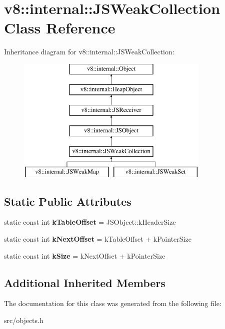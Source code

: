 \hypertarget{classv8_1_1internal_1_1_j_s_weak_collection}{}\section{v8\+:\+:internal\+:\+:J\+S\+Weak\+Collection Class Reference}
\label{classv8_1_1internal_1_1_j_s_weak_collection}
Inheritance diagram for v8\+:\+:internal\+:\+:J\+S\+Weak\+Collection\+:\begin{figure}[H]
\begin{center}
\leavevmode
\includegraphics[height=6.000000cm]{classv8_1_1internal_1_1_j_s_weak_collection}
\end{center}
\end{figure}
\subsection*{Static Public Attributes}
\begin{DoxyCompactItemize}
\item 
\hypertarget{classv8_1_1internal_1_1_j_s_weak_collection_aec7728f81b75ffdf112c4371af4e3e61}{}static const int {\bfseries k\+Table\+Offset} = J\+S\+Object\+::k\+Header\+Size\label{classv8_1_1internal_1_1_j_s_weak_collection_aec7728f81b75ffdf112c4371af4e3e61}

\item 
\hypertarget{classv8_1_1internal_1_1_j_s_weak_collection_a733260c7b194b11f4ba80fe0ff3c835c}{}static const int {\bfseries k\+Next\+Offset} = k\+Table\+Offset + k\+Pointer\+Size\label{classv8_1_1internal_1_1_j_s_weak_collection_a733260c7b194b11f4ba80fe0ff3c835c}

\item 
\hypertarget{classv8_1_1internal_1_1_j_s_weak_collection_a9589d84cb7af40ee80511bdd2788d955}{}static const int {\bfseries k\+Size} = k\+Next\+Offset + k\+Pointer\+Size\label{classv8_1_1internal_1_1_j_s_weak_collection_a9589d84cb7af40ee80511bdd2788d955}

\end{DoxyCompactItemize}
\subsection*{Additional Inherited Members}


The documentation for this class was generated from the following file\+:\begin{DoxyCompactItemize}
\item 
src/objects.\+h\end{DoxyCompactItemize}
